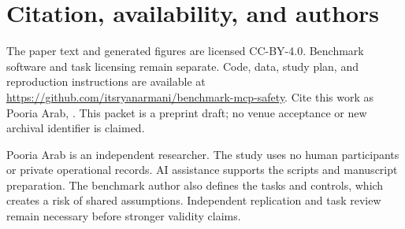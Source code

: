 \documentclass{article}
\begin{document}
\section{Citation, availability, and authors}
The paper text and generated figures are licensed CC-BY-4.0. Benchmark software and task licensing remain separate. Code, data, study plan, and reproduction instructions are available at \url{https://github.com/itsryanarmani/benchmark-mcp-safety}. Cite this work as Pooria Arab, \emph{\PaperTitle}. This packet is a preprint draft; no venue acceptance or new archival identifier is claimed.

Pooria Arab is an independent researcher. The study uses no human participants or private operational records. AI assistance supports the scripts and manuscript preparation. The benchmark author also defines the tasks and controls, which creates a risk of shared assumptions. Independent replication and task review remain necessary before stronger validity claims.



\end{document}
